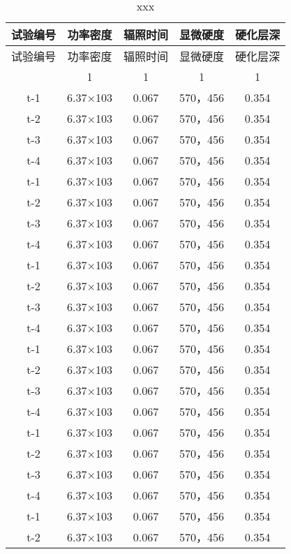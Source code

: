 \documentclass[../../main.tex]{subfiles}
\begin{document}
\begin{longtable}{ccccc}
\caption{xxx}
\label{tab:xxx} \\
\hline
试验编号 & 功率密度 & 辐照时间 & 显微硬度       & 硬化层深\\ 
\hline
\endfirsthead
\hline
试验编号 & 功率密度 & 辐照时间 & 显微硬度       & 硬化层深\\ 
\hline
\endhead

\hline
\endfoot
\hline 
1&1&1&1&1\\
\hline
\endlastfoot
t-1     &6.37×103       &0.067  &570，456        &0.354\\
t-2     &6.37×103       &0.067  &570，456        &0.354\\
t-3     &6.37×103       &0.067  &570，456        &0.354\\
t-4     &6.37×103       &0.067  &570，456        &0.354\\
t-1     &6.37×103       &0.067  &570，456        &0.354\\
t-2     &6.37×103       &0.067  &570，456        &0.354\\
t-3     &6.37×103       &0.067  &570，456        &0.354\\
t-4     &6.37×103       &0.067  &570，456        &0.354\\
t-1     &6.37×103       &0.067  &570，456        &0.354\\
t-2     &6.37×103       &0.067  &570，456        &0.354\\
t-3     &6.37×103       &0.067  &570，456        &0.354\\
t-4     &6.37×103       &0.067  &570，456        &0.354\\
t-1     &6.37×103       &0.067  &570，456        &0.354\\
t-2     &6.37×103       &0.067  &570，456        &0.354\\
t-3     &6.37×103       &0.067  &570，456        &0.354\\
t-4     &6.37×103       &0.067  &570，456        &0.354\\
t-1     &6.37×103       &0.067  &570，456        &0.354\\
t-2     &6.37×103       &0.067  &570，456        &0.354\\
t-3     &6.37×103       &0.067  &570，456        &0.354\\
t-4     &6.37×103       &0.067  &570，456        &0.354\\
t-1     &6.37×103       &0.067  &570，456        &0.354\\
t-2     &6.37×103       &0.067  &570，456        &0.354\\

\end{longtable}
\end{document}
